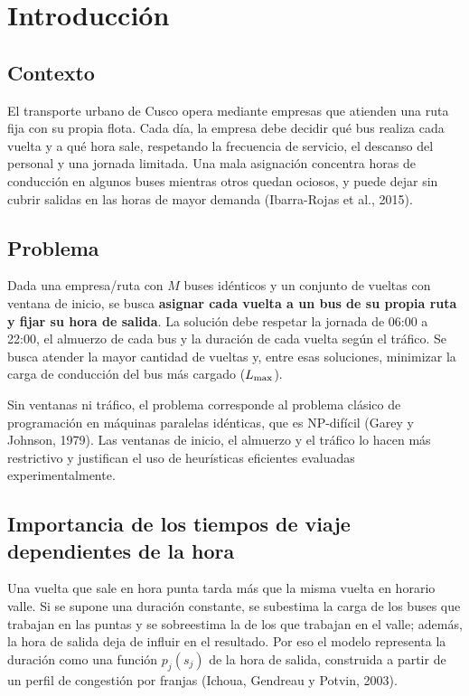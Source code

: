 \section{Introducción}

\subsection{Contexto}
El transporte urbano de Cusco opera mediante empresas que atienden una ruta fija con su propia flota. Cada día, la empresa debe decidir qué bus realiza cada vuelta y a qué hora sale, respetando la frecuencia de servicio, el descanso del personal y una jornada limitada. Una mala asignación concentra horas de conducción en algunos buses mientras otros quedan ociosos, y puede dejar sin cubrir salidas en las horas de mayor demanda (Ibarra-Rojas et al., 2015).

\subsection{Problema}
Dada una empresa/ruta con $M$ buses idénticos y un conjunto de vueltas con ventana de inicio, se busca \textbf{asignar cada vuelta a un bus de su propia ruta y fijar su hora de salida}. La solución debe respetar la jornada de 06:00 a 22:00, el almuerzo de cada bus y la duración de cada vuelta según el tráfico. Se busca atender la mayor cantidad de vueltas y, entre esas soluciones, minimizar la carga de conducción del bus más cargado ($L_{\max}$).

Sin ventanas ni tráfico, el problema corresponde al problema clásico de programación en máquinas paralelas idénticas, que es NP-difícil (Garey y Johnson, 1979). Las ventanas de inicio, el almuerzo y el tráfico lo hacen más restrictivo y justifican el uso de heurísticas eficientes evaluadas experimentalmente.

\subsection{Importancia de los tiempos de viaje dependientes de la hora}
Una vuelta que sale en hora punta tarda más que la misma vuelta en horario valle. Si se supone una duración constante, se subestima la carga de los buses que trabajan en las puntas y se sobreestima la de los que trabajan en el valle; además, la hora de salida deja de influir en el resultado. Por eso el modelo representa la duración como una función $p_j(s_j)$ de la hora de salida, construida a partir de un perfil de congestión por franjas (Ichoua, Gendreau y Potvin, 2003).

